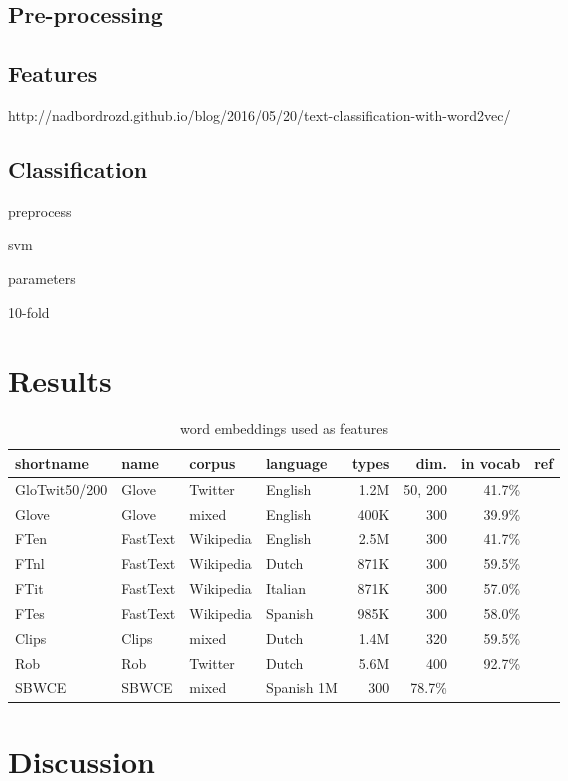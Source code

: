 \documentclass[11pt]{article}
\begin{document}
\subsection{Pre-processing}


\subsection{Features}

http://nadbordrozd.github.io/blog/2016/05/20/text-classification-with-word2vec/

\subsection{Classification}

preprocess



svm

parameters

10-fold

\section{Results}
\begin{table*}[ht]
  \caption{word embeddings used as features}
  \label{tab:embeddings}
  \begin{tabular}{ l l l l r r r }
shortname & name & corpus &language & types & dim. & in vocab & ref \\
\hline
GloTwit50/200 & Glove & Twitter & English & 1.2M & 50, 200 & 41.7\% & ~\\
Glove & Glove & mixed & English & 400K & 300 & 39.9\% \\
FTen & FastText & Wikipedia & English & 2.5M & 300 & 41.7\% \\
FTnl & FastText & Wikipedia & Dutch & 871K & 300 & 59.5\% \\
FTit & FastText & Wikipedia & Italian & 871K & 300 & 57.0\% \\
FTes & FastText & Wikipedia & Spanish & 985K & 300 & 58.0\% \\
Clips & Clips & mixed & Dutch & 1.4M & 320 & 59.5\% \\
Rob & Rob & Twitter & Dutch & 5.6M & 400 & 92.7\% \\
SBWCE & SBWCE & mixed & Spanish 1M & 300 & 78.7\% \\
\end{tabular}
\end{table*}
\section{Discussion}
\end{document}
